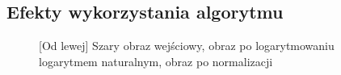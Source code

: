 \documentclass[a4paper,12pt, titlepage]{report}
\begin{document}
\subsection*{Efekty wykorzystania algorytmu}
\begin{figure}[h]
    \centering
    \caption{[Od lewej] Szary obraz wejściowy, obraz po logarytmowaniu logarytmem naturalnym, obraz po normalizacji}%
    \label{fig:rysunek}%
\end{figure}
\FloatBarrier
\end{document}
